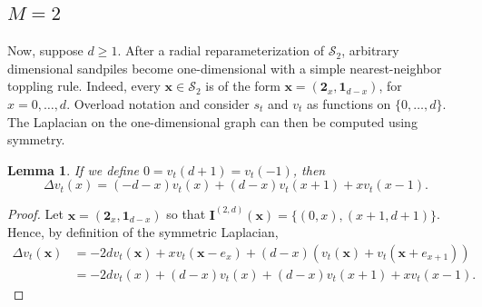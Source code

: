 \documentclass[12pt]{amsart}
\newtheorem{lemma}[theorem]{Lemma}
\begin{document}
	
	\subsection{\texorpdfstring{$M=2$}{M=2}}
	Now, suppose $d \geq 1$. After a radial reparameterization of $\mathcal{S}_2$, arbitrary dimensional sandpiles become one-dimensional with a simple nearest-neighbor 
	toppling rule.  Indeed, every $\mathbf{x} \in \mathcal{S}_2$ is of the form $\mathbf{x} =(\mathbf{2}_{x},\mathbf{1}_{d-x})$, for $x = 0, \ldots, d$. Overload notation and consider $s_t$ and $v_t$ as functions on $\{0, \ldots, d\}$. The Laplacian on the one-dimensional graph can then be computed using symmetry. 
	\begin{lemma}
		If we define $0 = v_t(d+1) = v_t(-1)$, then 
		\[
		\Delta v_t(x) = (-d - x) v_t(x) + (d-x) v_t(x+1) + x v_t(x-1).
		\]
	\end{lemma}
	\begin{proof}
			Let $\mathbf{x} = (\mathbf{2}_{x},\mathbf{1}_{d-x})$ so that $\mathbf{I}^{(2,d)}(\mathbf{x}) = \{ (0,x), (x+1,d+1) \}$.
			Hence, by definition of the symmetric Laplacian, 
\begin{align*}
				\Delta v_t( \mathbf{x}) &= -2 d v_t(\mathbf{x}) + x v_t(\mathbf{x} - e_x) + (d-x) (v_t(\mathbf{x}) + v_t(\mathbf{x} + e_{x+1}))  \\
				&= -2d v_t(x) + (d-x) v_t(x) + (d-x) v_t(x+1) + x v_t(x-1).
\end{align*}

	

		
	\end{proof}
	
\end{document}

